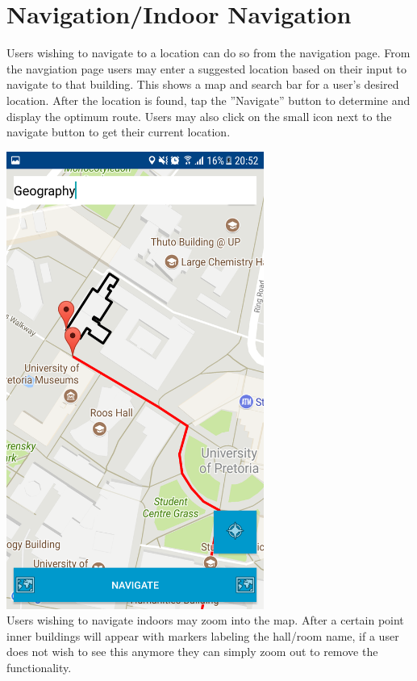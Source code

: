 \documentclass{article}
\begin{document}
\section{Navigation/Indoor Navigation}
	Users wishing to navigate to a location can do so from the navigation page. From the navgiation page users may enter a suggested location based on their input to navigate to that building. This shows a map and search bar for a user's desired location. After the location is found, tap the ''Navigate'' button to determine and display the optimum route. Users may also click on the small icon next to the navigate button to get their current location.
		\par
	\includegraphics[height=15cm]{navupnavigation.png}
	\\
\newpage
	Users wishing to navigate indoors may zoom into the map. After a certain point inner buildings will appear with markers labeling the hall/room name, if a user does not wish to see this 		anymore they can simply zoom out to remove the functionality.
	\\
\end{document}
